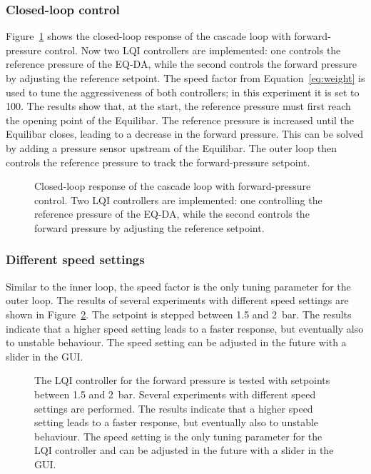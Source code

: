\documentclass[12pt,a4paper]{article}
\begin{document}
\subsubsection{Closed-loop control}
Figure~\ref{fig:forward_pressure_closed_loop} shows the closed-loop response of the cascade loop with forward-pressure control. Now two LQI controllers are implemented: one controls the reference pressure of the EQ-DA, while the second controls the forward pressure by adjusting the reference setpoint. The speed factor from Equation~\eqref{eq:weight} is used to tune the aggressiveness of both controllers; in this experiment it is set to 100. The results show that, at the start, the reference pressure must first reach the opening point of the Equilibar. The reference pressure is increased until the Equilibar closes, leading to a decrease in the forward pressure. This can be solved by adding a pressure sensor upstream of the Equilibar. The outer loop then controls the reference pressure to track the forward-pressure setpoint.
\begin{figure}[h!]
    \centering
    
    \caption{Closed-loop response of the cascade loop with forward-pressure control. Two LQI controllers are implemented: one controlling the reference pressure of the EQ-DA, while the second controls the forward pressure by adjusting the reference setpoint.}
    \label{fig:forward_pressure_closed_loop}
\end{figure}

\newpage
\subsubsection{Different speed settings}
Similar to the inner loop, the speed factor is the only tuning parameter for the outer loop. The results of several experiments with different speed settings are shown in Figure~\ref{fig:forward_pressure_closed_loop_step_response}. The setpoint is stepped between 1.5 and 2~bar. The results indicate that a higher speed setting leads to a faster response, but eventually also to unstable behaviour. The speed setting can be adjusted in the future with a slider in the GUI.
\begin{figure}[h!]
    \centering
    
    \caption{The LQI controller for the forward pressure is tested with setpoints between 1.5 and 2~bar. Several experiments with different speed settings are performed. The results indicate that a higher speed setting leads to a faster response, but eventually also to unstable behaviour. The speed setting is the only tuning parameter for the LQI controller and can be adjusted in the future with a slider in the GUI.}
    \label{fig:forward_pressure_closed_loop_step_response}
\end{figure}
\end{document}
